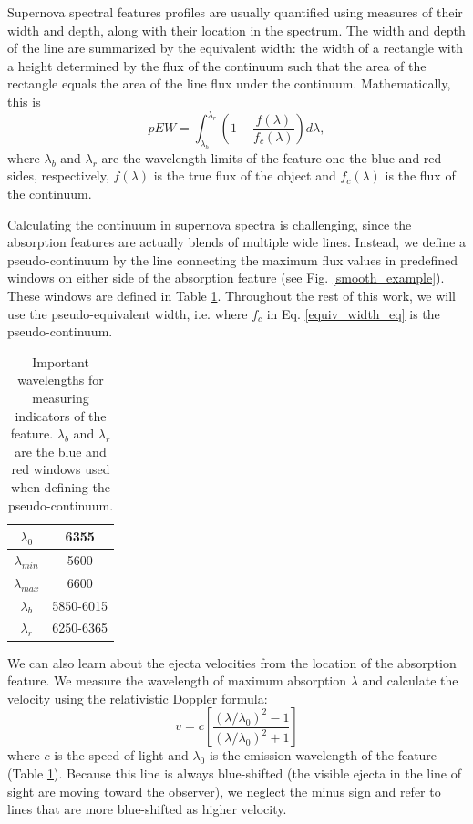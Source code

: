 Supernova spectral features profiles are usually quantified using measures of their width and depth, along with their location in the spectrum. The width and depth of the line are summarized by the equivalent width: the width of a rectangle with a height determined by the flux of the continuum such that the area of the rectangle equals the area of the line flux under the continuum. Mathematically, this is
\begin{equation}
    pEW = \displaystyle\int_{\lambda_b}^{\lambda_r}
    \left(1-\frac{f(\lambda)}{f_c(\lambda)}\right)d\lambda,
    \label{equiv_width_eq}
\end{equation}
where $\lambda_b$ and $\lambda_r$ are the wavelength limits of the feature one the blue and red sides, respectively, $f(\lambda)$ is the true flux of the object and $f_c(\lambda)$ is the flux of the continuum.

Calculating the continuum in supernova spectra is challenging, since the absorption features are actually blends of multiple wide lines. Instead, we define a pseudo-continuum by the line connecting the maximum flux values in predefined windows on either side of the absorption feature (see Fig. \ref{smooth_example}). These windows are defined in Table \ref{wavelength_ranges}. Throughout the rest of this work, we will use the pseudo-equivalent width, i.e. where $f_c$ in Eq. \ref{equiv_width_eq} is the pseudo-continuum.

\begin{table}[htbp]
    \centering
    \begin{tabular}{|c|c|}\hline
         $\lambda_0$ & 6355 \\\hline
         $\lambda_{min}$ & 5600 \\\hline
         $\lambda_{max}$ & 6600 \\\hline
         $\lambda_b$ & 5850-6015 \\\hline
         $\lambda_r$ & 6250-6365 \\\hline
    \end{tabular}
    \caption{Important wavelengths for measuring indicators of the \siliconii\; feature. $\lambda_b$ and $\lambda_r$ are the blue and red windows used when defining the pseudo-continuum.}
    \label{wavelength_ranges}
\end{table}

We can also learn about the ejecta velocities from the location of the absorption feature. We measure the wavelength of maximum absorption $\lambda$ and calculate the velocity using the relativistic Doppler formula:
\begin{equation}
v = c\left[\frac{(\lambda/\lambda_0)^2 -1}{(\lambda/\lambda_0)^2 +1}\right]
\label{doppler}
\end{equation}
where $c$ is the speed of light and $\lambda_0$ is the emission wavelength of the feature (Table \ref{wavelength_ranges}). Because this line is always blue-shifted (the visible ejecta in the line of sight are moving toward the observer), we neglect the minus sign and refer to lines that are more blue-shifted as higher velocity.

